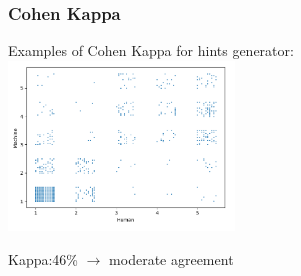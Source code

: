 \documentclass{beamer}
\begin{document}
\begin{frame}
\frametitle{Cohen Kappa }
\begin{center}
	
	
	
Examples of Cohen Kappa for hints generator: \\
 	\includegraphics[width=60mm]{kohen.png} 
	
	
\end{center}
Kappa:46\% $\rightarrow$ moderate agreement
\end{frame}
\end{document}
